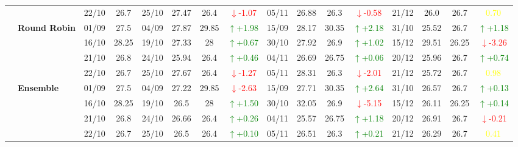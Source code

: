 \documentclass{ieeeaccess}
\begin{document}
{\begin{longtable}{llcc|cccc|cccc|cccc}
&
& 22/10 & 26.7 & 25/10 & 27.47 & 26.4 & \textcolor{red}{\(\downarrow\)-1.07} & 05/11 & 26.88 & 26.3 & \textcolor{red}{\(\downarrow\)-0.58} & 21/12 & 26.0 & 26.7 & \textcolor{yellow}{0.70} \\
\cmidrule(lr){2-16}


& \textbf{Round Robin}
& 01/09 & 27.5 & 04/09 & 27.87 & 29.85 & \textcolor{green}{\(\uparrow\)+1.98} & 15/09 & 28.17 & 30.35 & \textcolor{green}{\(\uparrow\)+2.18} & 31/10 & 25.52 & 26.7 & \textcolor{green}{\(\uparrow\)+1.18} \\

& 
& 16/10 & 28.25 & 19/10 & 27.33 & 28 & \textcolor{green}{\(\uparrow\)+0.67} & 30/10 & 27.92 & 26.9 & \textcolor{green}{\(\uparrow\)+1.02} & 15/12 & 29.51 & 26.25 & \textcolor{red}{\(\downarrow\)-3.26} \\

& 
& 21/10 & 26.8 & 24/10 & 25.94 & 26.4 & \textcolor{green}{\(\uparrow\)+0.46} & 04/11 & 26.69 & 26.75 & \textcolor{green}{\(\uparrow\)+0.06} & 20/12 & 25.96 & 26.7 & \textcolor{green}{\(\uparrow\)+0.74} \\

&
& 22/10 & 26.7 & 25/10 & 27.67 & 26.4 & \textcolor{red}{\(\downarrow\)-1.27} & 05/11 & 28.31 & 26.3 & \textcolor{red}{\(\downarrow\)-2.01} & 21/12 & 25.72 & 26.7 & \textcolor{yellow}{0.98} \\
\cmidrule(lr){2-16}


& \textbf{Ensemble}
& 01/09 & 27.5 & 04/09 & 27.22 & 29.85& \textcolor{red}{\(\downarrow\)-2.63} & 15/09 & 27.71 & 30.35 & \textcolor{green}{\(\uparrow\)+2.64} & 31/10 & 26.57 & 26.7 & \textcolor{green}{\(\uparrow\)+0.13} \\

& 
& 16/10 & 28.25 & 19/10 & 26.5 & 28 & \textcolor{green}{\(\uparrow\)+1.50} & 30/10 & 32.05 & 26.9 & \textcolor{red}{\(\downarrow\)-5.15} & 15/12 & 26.11 & 26.25 & \textcolor{green}{\(\uparrow\)+0.14} \\

& 
& 21/10 & 26.8 & 24/10 & 26.66 & 26.4 & \textcolor{green}{\(\uparrow\)+0.26} & 04/11 & 25.57 & 26.75 & \textcolor{green}{\(\uparrow\)+1.18} & 20/12 & 26.91 & 26.7 & \textcolor{red}{\(\downarrow\)-0.21} \\

&
& 22/10 & 26.7 & 25/10 & 26.5 & 26.4 & \textcolor{green}{\(\uparrow\)+0.10} & 05/11 & 26.51 & 26.3 & \textcolor{green}{\(\uparrow\)+0.21} & 21/12 & 26.29 & 26.7 & \textcolor{yellow}{0.41} \\
\midrule




\end{longtable}}
\end{document}
